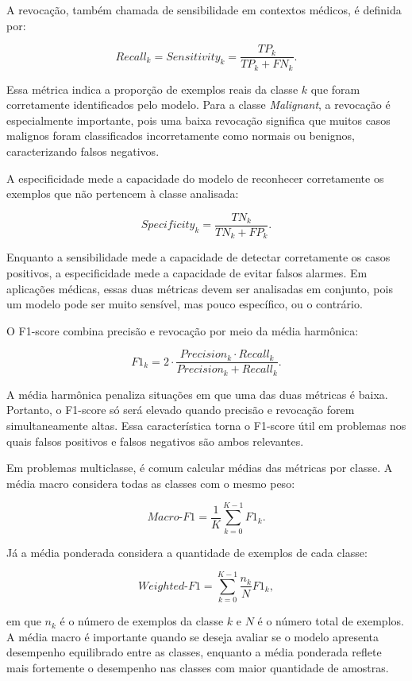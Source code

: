 \documentclass[
    12pt,
    openright,
    oneside,
    a4paper,
    english,
    brazil
]{abntex2}
\begin{document}
A revocação, também chamada de sensibilidade em contextos médicos, é definida por:

\[
Recall_k = Sensitivity_k =
\frac{TP_k}{TP_k + FN_k}.
\]

Essa métrica indica a proporção de exemplos reais da classe \(k\) que foram corretamente identificados pelo modelo. Para a classe \textit{Malignant}, a revocação é especialmente importante, pois uma baixa revocação significa que muitos casos malignos foram classificados incorretamente como normais ou benignos, caracterizando falsos negativos.

A especificidade mede a capacidade do modelo de reconhecer corretamente os exemplos que não pertencem à classe analisada:

\[
Specificity_k =
\frac{TN_k}{TN_k + FP_k}.
\]

Enquanto a sensibilidade mede a capacidade de detectar corretamente os casos positivos, a especificidade mede a capacidade de evitar falsos alarmes. Em aplicações médicas, essas duas métricas devem ser analisadas em conjunto, pois um modelo pode ser muito sensível, mas pouco específico, ou o contrário.

O F1-score combina precisão e revocação por meio da média harmônica:

\[
F1_k =
2 \cdot
\frac{Precision_k \cdot Recall_k}
{Precision_k + Recall_k}.
\]

A média harmônica penaliza situações em que uma das duas métricas é baixa. Portanto, o F1-score só será elevado quando precisão e revocação forem simultaneamente altas. Essa característica torna o F1-score útil em problemas nos quais falsos positivos e falsos negativos são ambos relevantes.

Em problemas multiclasse, é comum calcular médias das métricas por classe. A média macro considera todas as classes com o mesmo peso:

\[
Macro\text{-}F1 =
\frac{1}{K}
\sum_{k=0}^{K-1}
F1_k.
\]

Já a média ponderada considera a quantidade de exemplos de cada classe:

\[
Weighted\text{-}F1 =
\sum_{k=0}^{K-1}
\frac{n_k}{N}
F1_k,
\]

em que \(n_k\) é o número de exemplos da classe \(k\) e \(N\) é o número total de exemplos. A média macro é importante quando se deseja avaliar se o modelo apresenta desempenho equilibrado entre as classes, enquanto a média ponderada reflete mais fortemente o desempenho nas classes com maior quantidade de amostras.
\end{document}
